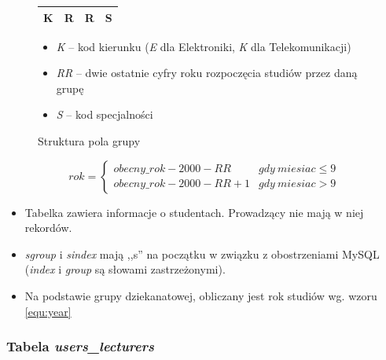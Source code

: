 \documentclass[a4paper,12pt,oneside]{report}
\begin{document}
\begin{figure}[h]
  \centering
  \begin{tabular}{|c|c|c|c|}\hline
  K & R & R & S\\\hline
  \end{tabular}
  \begin{itemize}
    \item \emph{K} -- kod kierunku (\emph{E} dla Elektroniki, \emph{K} dla Telekomunikacji)
    \item \emph{RR} -- dwie ostatnie cyfry roku rozpoczęcia studiów przez daną grupę
    \item \emph{S} -- kod specjalności
  \end{itemize}
  \caption{Struktura pola grupy\label{fig:group}}
\end{figure}
\begin{equation}
  rok = \left\{ \begin{array}{ll}
  obecny\_rok - 2000 - RR & gdy~miesiac \le 9\\
  obecny\_rok - 2000 - RR + 1 & gdy~miesiac > 9
  \end{array} \right.
  \label{equ:year}
\end{equation}
\begin{itemize}
  \item Tabelka zawiera informacje o studentach. Prowadzący nie mają w niej rekordów.
  \item \emph{sgroup} i \emph{sindex} mają ,,s'' na początku w związku z obostrzeniami MySQL (\emph{index} i \emph{group} są słowami zastrzeżonymi).
  \item Na podstawie grupy dziekanatowej, obliczany jest rok studiów wg. wzoru \ref{equ:year}
\end{itemize}

\newpage
\subsubsection{Tabela \emph{users\_lecturers}}
\label{subsub:users_lecturers}
\end{document}
